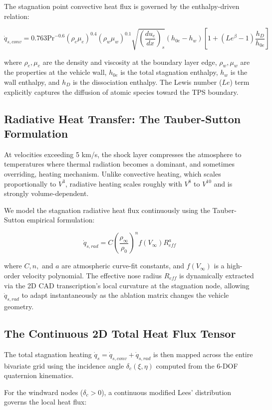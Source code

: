\documentclass[11pt,a4paper]{article}
\theoremstyle{definition}
\numberwithin{equation}{section}
\begin{document}
The stagnation point convective heat flux is governed by the enthalpy-driven relation:

$$\dot{q}_{s, conv} = 0.763 \text{Pr}^{-0.6} (\rho_e \mu_e)^{0.4} (\rho_w \mu_w)^{0.1} \sqrt{\left(\frac{du_e}{dx}\right)_s} (h_{0e} - h_w) \left[ 1 + (Le^\beta - 1)\frac{h_D}{h_{0e}} \right]$$

where $\rho_e, \mu_e$ are the density and viscosity at the boundary layer edge, $\rho_w, \mu_w$ are the properties at the vehicle wall, $h_{0e}$ is the total stagnation enthalpy, $h_w$ is the wall enthalpy, and $h_D$ is the dissociation enthalpy. The Lewis number ($Le$) term explicitly captures the diffusion of atomic species toward the TPS boundary.

\subsection{Radiative Heat Transfer: The Tauber-Sutton Formulation}
At velocities exceeding 5 km/s, the shock layer compresses the atmosphere to temperatures where thermal radiation becomes a dominant, and sometimes overriding, heating mechanism. Unlike convective heating, which scales proportionally to $V^3$, radiative heating scales roughly with $V^8$ to $V^{10}$ and is strongly volume-dependent.

We model the stagnation radiative heat flux continuously using the Tauber-Sutton empirical formulation:

$$\dot{q}_{s, rad} = C \left( \frac{\rho_\infty}{\rho_0} \right)^n f(V_\infty) R_{eff}^a$$

where $C, n,$ and $a$ are atmospheric curve-fit constants, and $f(V_\infty)$ is a high-order velocity polynomial. The effective nose radius $R_{eff}$ is dynamically extracted via the 2D CAD transcription's local curvature at the stagnation node, allowing $\dot{q}_{s, rad}$ to adapt instantaneously as the ablation matrix changes the vehicle geometry.

\subsection{The Continuous 2D Total Heat Flux Tensor}
The total stagnation heating $\dot{q}_s = \dot{q}_{s, conv} + \dot{q}_{s, rad}$ is then mapped across the entire bivariate grid using the incidence angle $\delta_c(\xi, \eta)$ computed from the 6-DOF quaternion kinematics.

For the windward nodes ($\delta_c > 0$), a continuous modified Lees' distribution governs the local heat flux:
\end{document}
